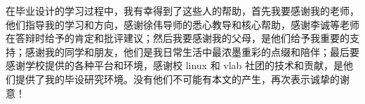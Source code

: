 
\begin{acknowledgements}

在毕业设计的学习过程中，我有幸得到了这些人的帮助，首先我要感谢我的老师，他们指导我的学习和方向，感谢徐伟导师的悉心教导和核心帮助，感谢李诚等老师在答辩时给予的肯定和批评建议；然后我要感谢我的父母，是他们给予我重要的支持；感谢我的同学和朋友，他们是我日常生活中最浓墨重彩的点缀和陪伴；最后要感谢学校提供的各种平台和环境，感谢校 linux 和 vlab 社团的技术和贡献，是他们提供了我的毕设研究环境。没有他们不可能有本文的产生，再次表示诚挚的谢意！


\end{acknowledgements}
